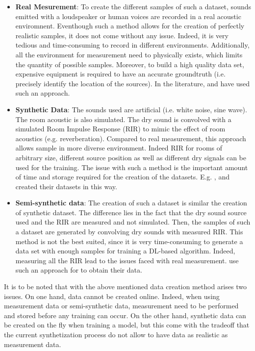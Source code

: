 \documentclass[11pt,a4paper,twoside]{report}
\begin{document}
\begin{itemize}
    \item \textbf{Real Mesurement}: To create the different samples of such a dataset, sounds emitted with a loudspeaker or human voices are recorded in a real acoustic enviromnent. Eventhough such a method allows for the creation of perfectly realistic samples, it does not come without any issue. Indeed, it is very tedious and time-consuming to record in different environments. Additionally, all the environment for measurement need to physically exists, which limits the quantity of possible samples. Moreover, to build a high quality data set, expensive equipment is required to have an accurate groundtruth (i.e. precisely identify the location of the sources). In the literature, \cite{he2018deep} and \cite{ferguson2018sound} have used such an approach.
    \item \textbf{Synthetic Data}: The sounds used are artificial (i.e. white noise, sine wave). The room acoustic is also simulated. The dry sound is convolved with a simulated Room Impulse Response (RIR) to mimic the effect of room acoustics (e.g. reverberation). Compared to real measurement, this approach allows sample in more diverse environment. Indeed RIR for rooms of arbitrary size, different source position as well as different dry signals can be used for the training. The issue with such a method is the important amount of time and storage required for the creation of the datasets. E.g. \cite{chakrabarty2017broadband}, \cite{perotin2018crnn} and \cite{adavanne2018direction} created their datasets in this way.
    \item \textbf{Semi-synthetic data}: The creation of such a dataset is similar the creation of synthetic dataset. The difference lies in the fact that the dry sound source used and the RIR are measured and not simulated. Then, the samples of such a dataset are generated by convolving dry sounds with measured RIR. This method is not the best suited, since it is very time-consuming to generate a data set with enough samples for training a DL-based algorithm. Indeed, measuring all the RIR lead to the issues faced with real measurement. \cite{takeda2016sound} use such an approach for to obtain their data.
\end{itemize}

It is to be noted that with the above mentioned data creation method arises two issues. On one hand, data cannot be created online. Indeed, when using measurement data or semi-synthetic data, measurement need to be performed and stored before any training can occur. On the other hand, synthetic data can be created on the fly when training a model, but this come with the tradeoff that the current synthetization process do not allow to have data as realistic as measurement data.
\end{document}
